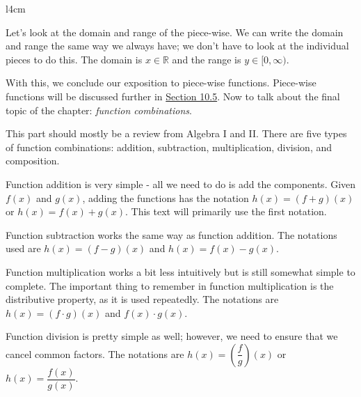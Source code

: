 \documentclass[../book.tex]{subfiles}
\begin{document}
\begin{wrapfigure}{l}{4cm}
    \centering
\end{wrapfigure}

Let's look at the domain and range of the piece-wise.  We can write the domain and range the same way we always have; we don't have to look at the individual pieces to do this.  The domain is $x\in\mathbb{R}$ and the range is $y\in[0,\infty)$.  

With this, we conclude our exposition to piece-wise functions.  Piece-wise functions will be discussed further in \hyperlink{section.10.5}{Section 10.5}.  Now to talk about the final topic of the chapter: \textit{function combinations}.

This part should mostly be a review from Algebra I and II.  There are five types of function combinations: addition, subtraction, multiplication, division, and composition.

Function addition is very simple - all we need to do is add the components.  Given $f(x)$ and $g(x)$, adding the functions has the notation $h(x)=(f+g)(x)$ or $h(x)=f(x)+g(x)$.  This text will primarily use the first notation.

Function subtraction works the same way as function addition.  The notations used are $h(x)=(f-g)(x)$ and $h(x)=f(x)-g(x)$.

Function multiplication works a bit less intuitively but is still somewhat simple to complete.  The important thing to remember in function multiplication is the distributive property, as it is used repeatedly.  The notations are $h(x)=(f\cdot g)(x)$ and $f(x)\cdot g(x)$.

Function division is pretty simple as well; however, we need to ensure that we cancel common factors.  The notations are $h(x)=\left(\dfrac{f}{g}\right)(x)$ or $h(x)=\dfrac{f(x)}{g(x)}$.
\end{document}
